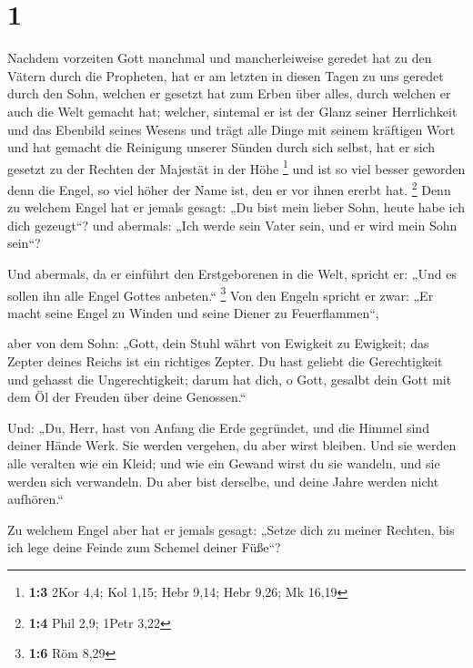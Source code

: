 \hypertarget{section}{%
\section{1}\label{section}}

 Nachdem vorzeiten Gott manchmal und mancherleiweise geredet
hat zu den Vätern durch die Propheten,  hat er am letzten in
diesen Tagen zu uns geredet durch den Sohn, welchen er gesetzt hat zum
Erben über alles, durch welchen er auch die Welt gemacht hat;
 welcher, sintemal er ist der Glanz seiner Herrlichkeit und
das Ebenbild seines Wesens und trägt alle Dinge mit seinem kräftigen
Wort und hat gemacht die Reinigung unserer Sünden durch sich selbst, hat
er sich gesetzt zu der Rechten der Majestät in der Höhe \footnote{\textbf{1:3}
  2Kor 4,4; Kol 1,15; Hebr 9,14; Hebr 9,26; Mk 16,19}  und
ist so viel besser geworden denn die Engel, so viel höher der Name ist,
den er vor ihnen ererbt hat. \footnote{\textbf{1:4} Phil 2,9; 1Petr 3,22}
 Denn zu welchem Engel hat er jemals gesagt: „Du bist mein
lieber Sohn, heute habe ich dich gezeugt``? und abermals: „Ich werde
sein Vater sein, und er wird mein Sohn sein``?

 Und abermals, da er einführt den Erstgeborenen in die Welt,
spricht er: „Und es sollen ihn alle Engel Gottes anbeten.`` \footnote{\textbf{1:6}
  Röm 8,29}  Von den Engeln spricht er zwar: „Er macht seine
Engel zu Winden und seine Diener zu Feuerflammen``,

 aber von dem Sohn: „Gott, dein Stuhl währt von Ewigkeit zu
Ewigkeit; das Zepter deines Reichs ist ein richtiges Zepter.
 Du hast geliebt die Gerechtigkeit und gehasst die
Ungerechtigkeit; darum hat dich, o Gott, gesalbt dein Gott mit dem Öl
der Freuden über deine Genossen.``

 Und: „Du, Herr, hast von Anfang die Erde gegründet, und
die Himmel sind deiner Hände Werk.  Sie werden vergehen, du
aber wirst bleiben. Und sie werden alle veralten wie ein Kleid;
 und wie ein Gewand wirst du sie wandeln, und sie werden
sich verwandeln. Du aber bist derselbe, und deine Jahre werden nicht
aufhören.``

 Zu welchem Engel aber hat er jemals gesagt: „Setze dich zu
meiner Rechten, bis ich lege deine Feinde zum Schemel deiner Füße``?

